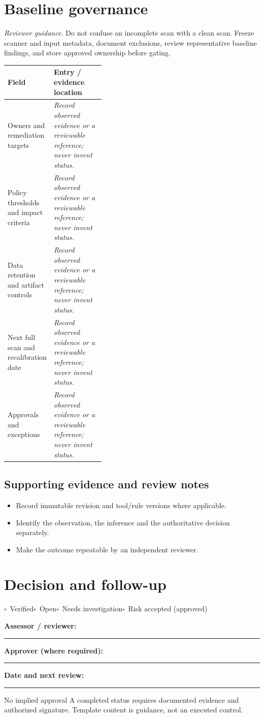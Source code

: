 \documentclass[10pt,letterpaper]{article}
\newcommand{\checkbox}{\(\square\)}
\newcommand{\blankline}{\noindent\rule{\linewidth}{0.35pt}\par\vspace{4pt}}
\begin{document}
\section{Baseline governance}
\textit{Reviewer guidance.} Do not confuse an incomplete scan with a clean scan. Freeze scanner and input metadata, document exclusions, review representative baseline findings, and store approved ownership before gating.
\begin{tabularx}{\linewidth}{@{}p{0.38\linewidth}Y@{}}
\toprule Field & Entry / evidence location\\\midrule
Owners and remediation targets & \textit{Record observed evidence or a reviewable reference; never invent status.}\\[1.0em]
\midrule
Policy thresholds and impact criteria & \textit{Record observed evidence or a reviewable reference; never invent status.}\\[1.0em]
\midrule
Data retention and artifact controls & \textit{Record observed evidence or a reviewable reference; never invent status.}\\[1.0em]
\midrule
Next full scan and recalibration date & \textit{Record observed evidence or a reviewable reference; never invent status.}\\[1.0em]
\midrule
Approvals and exceptions & \textit{Record observed evidence or a reviewable reference; never invent status.}\\[1.0em]
\midrule
\end{tabularx}
\subsection{Supporting evidence and review notes}
\begin{itemize}
\item Record immutable revision and tool/rule versions where applicable.
\item Identify the observation, the inference and the authoritative decision separately.
\item Make the outcome repeatable by an independent reviewer.
\end{itemize}
\clearpage
\section{Decision and follow-up}
\noindent\checkbox\ Verified\quad\checkbox\ Open\quad\checkbox\ Needs investigation\quad\checkbox\ Risk accepted (approved)\par
\noindent\textbf{Assessor / reviewer:}\par\blankline\textbf{Approver (where required):}\par\blankline\textbf{Date and next review:}\par\blankline
\begin{warnbox}{No implied approval}
A completed status requires documented evidence and authorized signature. Template content is guidance, not an executed control.\end{warnbox}
\end{document}
